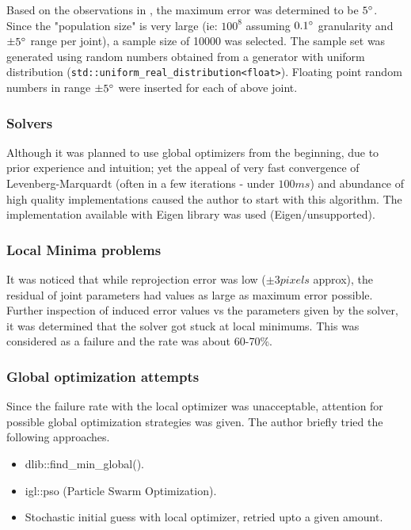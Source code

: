 \documentclass[english, printversion, nomenclature, notitle]{tuvisionthesis} %
\begin{document}
Based on the observations in , the maximum error was determined to be $5\degree$. Since the "population size" is very large (ie: $100^8$ assuming $0.1\degree$ granularity and $\pm5\degree$ range per joint), a sample size of 10000 was selected. The sample set was generated using random numbers obtained from a generator with uniform distribution (\lstinline{std::uniform_real_distribution<float>}). Floating point random numbers in range $\pm5\degree$ were inserted for each of above joint. 

\subsubsection{Solvers}

Although it was planned to use global optimizers from the beginning, due to prior experience and intuition; yet the appeal of very fast convergence of Levenberg-Marquardt (often in a few iterations - under $100ms$) and abundance of high quality implementations caused the author to start with this algorithm. The implementation available with Eigen library was used (Eigen/unsupported).

\subsubsection{Local Minima problems}
It was noticed that while reprojection error was low ($\pm3 pixels$ approx), the residual of joint parameters had values as large as maximum error possible. Further inspection of induced error values vs the parameters given by the solver, it was determined that the solver got stuck at local minimums. This was considered as a failure and the rate was about 60-70\%.

\subsubsection{Global optimization attempts}
Since the failure rate with the local optimizer was unacceptable, attention for possible global optimization strategies was given. The author briefly tried the following approaches.
\begin{itemize}
	\item dlib::find\_min\_global(). 
	\item igl::pso (Particle Swarm Optimization). 
	\item Stochastic initial guess with local optimizer, retried upto a given amount.
\end{itemize}
\end{document}
